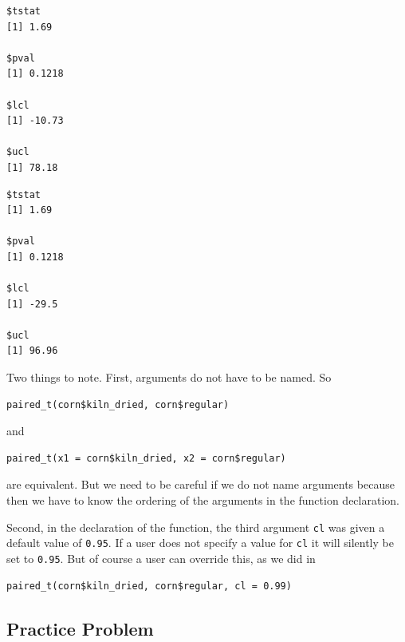 \documentclass[
]{krantz}
\makeatletter
\newenvironment{Shaded}{\begin{snugshade}}{\end{snugshade}}
\newcommand{\DataTypeTok}[1]{\textcolor[rgb]{0.27,0.27,0.27}{#1}}
\newcommand{\FloatTok}[1]{\textcolor[rgb]{0.06,0.06,0.06}{#1}}
\newcommand{\KeywordTok}[1]{\textcolor[rgb]{0.27,0.27,0.27}{\textbf{#1}}}
\newcommand{\NormalTok}[1]{#1}
\newcommand{\OperatorTok}[1]{\textcolor[rgb]{0.43,0.43,0.43}{\textbf{#1}}}
\newcommand{\StringTok}[1]{\textcolor[rgb]{0.5,0.5,0.5}{#1}}
\newenvironment{kframe}{%
\medskip{}
\setlength{\fboxsep}{.8em}
 \def\at@end@of@kframe{}%
 \ifinner\ifhmode%
  \def\at@end@of@kframe{\end{minipage}}%
  \begin{minipage}{\columnwidth}%
 \fi\fi%
 \def\FrameCommand##1{\hskip\@totalleftmargin \hskip-\fboxsep
 \colorbox{shadecolor}{##1}\hskip-\fboxsep
     \hskip-\linewidth \hskip-\@totalleftmargin \hskip\columnwidth}%
 \MakeFramed {\advance\hsize-\width
   \@totalleftmargin\z@ \linewidth\hsize
   \@setminipage}}%
 {\par\unskip\endMakeFramed%
 \at@end@of@kframe}
\renewenvironment{Shaded}{\begin{kframe}}{\end{kframe}}
\makeatother
\begin{document}
\begin{verbatim}
$tstat
[1] 1.69

$pval
[1] 0.1218

$lcl
[1] -10.73

$ucl
[1] 78.18
\end{verbatim}

\begin{Shaded}
\end{Shaded}

\begin{verbatim}
$tstat
[1] 1.69

$pval
[1] 0.1218

$lcl
[1] -29.5

$ucl
[1] 96.96
\end{verbatim}

Two things to note. First, arguments do not have to be named. So

\begin{verbatim}
paired_t(corn$kiln_dried, corn$regular)
\end{verbatim}

and

\begin{verbatim}
paired_t(x1 = corn$kiln_dried, x2 = corn$regular)
\end{verbatim}

are equivalent. But we need to be careful if we do not name arguments because then we have to know the ordering of the arguments in the function declaration.

Second, in the declaration of the function, the third argument \texttt{cl} was given a default value of \texttt{0.95}. If a user does not specify a value for \texttt{cl} it will silently be set to \texttt{0.95}. But of course a user can override this, as we did in

\begin{verbatim}
paired_t(corn$kiln_dried, corn$regular, cl = 0.99)
\end{verbatim}

\hypertarget{practice-problem-11}{%
\subsection{Practice Problem}\label{practice-problem-11}}
\end{document}
